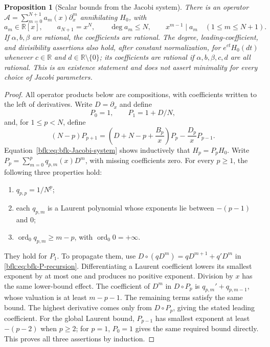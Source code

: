 \documentclass[11pt,a4paper]{article}
\newtheorem{proposition}[theorem]{Proposition}
\theoremstyle{definition}
\theoremstyle{remark}
\numberwithin{equation}{section}
\newcommand{\R}{\mathbb{R}}
\newcommand{\ff}[2]{#1^{\underline{#2}}}
\DeclareMathOperator{\ord}{ord}
\begin{document}
\begin{proposition}[Scalar bounds from the Jacobi system]\label{bfk:prop:bfk-jacobi-shape}
There is an operator $\mathcal A=\sum_{m=0}^{N+1}a_m(x)\partial_x^m$
annihilating $H_0$, with
\[
 a_m\in\R[x],\qquad a_{N+1}=x^N,\qquad
 \deg a_m\le N,\qquad x^{m-1}\mid a_m\quad(1\le m\le N+1).
\]
If $\alpha,b,\beta$ are rational, the coefficients are rational.
The degree, leading-coefficient, and divisibility assertions also hold,
after constant normalization, for $e^{ct}H_0(dt)$ whenever $c\in\R$ and
$d\in\R\setminus\{0\}$; its coefficients are rational if
$\alpha,b,\beta,c,d$ are all rational.
This is an existence statement and does not assert
minimality for every choice of Jacobi parameters.
\end{proposition}
\begin{proof}
All operator products below are compositions, with coefficients written to
the left of derivatives. Write $D=\partial_x$ and define
\[
 P_0=1,\qquad P_1=1+D/N,
\]
and, for $1\le p<N$, define
\begin{equation}\label{bfk:eq:bfk-P-recursion}
 (N-p)P_{p+1}
 =\left(D+N-p+\frac{B_p}{x}\right)P_p
       -\frac{D_p}{x}P_{p-1}.
\end{equation}
Equation~\eqref{bfk:eq:bfk-Jacobi-system} shows inductively that $H_p=P_pH_0$.
Write $P_p=\sum_{m=0}^p q_{p,m}(x)D^m$, with missing coefficients zero.
For every $p\ge1$, the following three properties hold:
\begin{enumerate}
\item $q_{p,p}=1/\ff Np$;
\item each $q_{p,m}$ is a Laurent polynomial whose exponents lie between
$-(p-1)$ and $0$;
\item $\ord_0 q_{p,m}\ge m-p$, with $\ord_0 0=+\infty$.
\end{enumerate}
They hold for $P_1$. To propagate them, use
$D\circ(qD^m)=qD^{m+1}+q'D^m$ in
\eqref{bfk:eq:bfk-P-recursion}. Differentiating a Laurent coefficient lowers its
smallest exponent by at most one and produces no positive exponent.
Division by $x$ has the same lower-bound effect. The coefficient of $D^m$
in $D\circ P_p$ is $q_{p,m}'+q_{p,m-1}$, whose valuation is at least
$m-p-1$. The remaining terms satisfy the same bound. The highest derivative
comes only from $D\circ P_p$, giving the stated leading coefficient.
For the global Laurent bound, $P_{p-1}$ has smallest exponent at least
$-(p-2)$ when $p\ge2$; for $p=1$, $P_0=1$ gives the same required bound
directly. This proves all three assertions by induction.


\end{proof}
\end{document}
